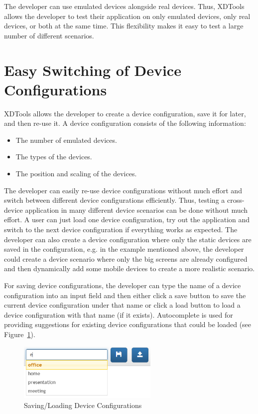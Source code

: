The developer can use emulated devices alongside real devices. Thus, XDTools allows the developer to test their application on only emulated devices, only real devices, or both at the same time. This flexibility makes it easy to test a large number of different scenarios.

\section{Easy Switching of Device Configurations}

XDTools allows the developer to create a device configuration, save it for later, and then re-use it. A device configuration consists of the following information:
\begin{itemize}
	\item The number of emulated devices.
	\item The types of the devices.
	\item The position and scaling of the devices.
\end{itemize}
The developer can easily re-use device configurations without much effort and switch between different device configurations efficiently. Thus, testing a cross-device application in many different device scenarios can be done without much effort. A user can just load one device configuration, try out the application and switch to the next device configuration if everything works as expected. The developer can also create a device configuration where only the static devices are saved in the configuration, e.g. in the example mentioned above, the developer could create a device scenario where only the big screens are already configured and then dynamically add some mobile devices to create a more realistic scenario.

For saving device configurations, the developer can type the name of a device configuration into an input field and then either click a save button to save the current device configuration under that name or click a load button to load a device configuration with that name (if it exists). Autocomplete is used for providing suggestions for existing device configurations that could be loaded (see Figure~\ref{fig:session_management}). 

\begin{figure}[H]
  \centering
    \includegraphics[width=0.6\textwidth]{images/screenshots/session_management_2.png}
	\caption[Screenshot: Saving/Loading device configurations]{Saving/Loading Device Configurations}
	\label{fig:session_management}
\end{figure}


